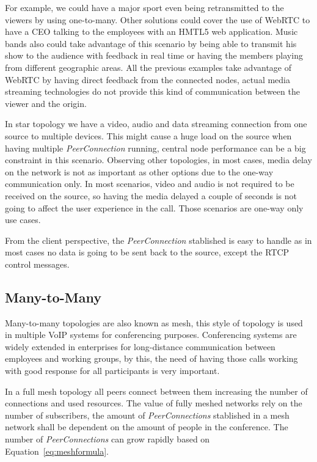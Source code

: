 For example, we could have a major sport even being retransmitted to the viewers by using one-to-many. Other solutions could cover the use of WebRTC to have a CEO talking to the employees with an HMTL5 web application. Music bands also could take advantage of this scenario by being able to transmit his show to the audience with feedback in real time or having the members playing from different geographic areas. All the previous examples take advantage of WebRTC by having direct feedback from the connected nodes, actual media streaming technologies do not provide this kind of communication between the viewer and the origin.

In star topology we have a video, audio and data streaming connection from one source to multiple devices. This might cause a huge load on the source when having multiple {\it PeerConnection} running, central node performance can be a big constraint in this scenario. Observing other topologies, in most cases, media delay on the network is not as important as other options due to the one-way communication only. In most scenarios, video and audio is not required to be received on the source, so having the media delayed a couple of seconds is not going to affect the user experience in the call. Those scenarios are one-way only use cases.

From the client perspective, the {\it PeerConnection} stablished is easy to handle as  in most cases no data is going to be sent back to the source, except the RTCP control messages.

\subsection{Many-to-Many}

Many-to-many topologies are also known as mesh, this style of topology is used in multiple VoIP systems for conferencing purposes. Conferencing systems are widely extended in enterprises for long-distance communication between employees and working groups, by this, the need of having those calls working with good response for all participants is very important.

In a full mesh topology all peers connect between them increasing the number of connections and used resources. The value of fully meshed networks rely on the number of subscribers, the amount of {\it PeerConnections} stablished in a mesh network shall be dependent on the amount of people in the conference. The number of {\it PeerConnections} can grow rapidly based on Equation~\ref{eq:meshformula}.

